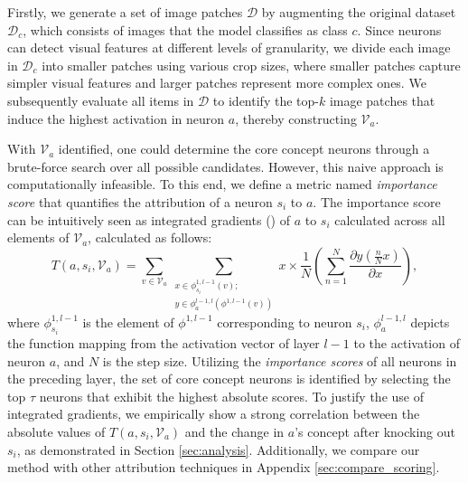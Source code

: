Firstly, we generate a set of image patches $\mathcal{D}$ by augmenting the original dataset $\mathcal{D}_c$, which consists of images that the model classifies as class $c$.
Since neurons can detect visual features at different levels of granularity, we divide each image in $\mathcal{D}_c$ into smaller patches using various crop sizes, where smaller patches capture simpler visual features and larger patches represent more complex ones. 
We subsequently evaluate all items in $\mathcal{D}$ to identify the top-$k$ image patches that induce the highest activation in neuron $a$, thereby constructing $\mathcal{V}_a$.

With $\mathcal{V}_a$ identified, one could determine the core concept neurons through a brute-force search over all possible candidates. However, this naive approach is computationally infeasible. 
To this end, we define a metric named \emph{importance score} that quantifies the attribution of a neuron $s_i$ to $a$.
The importance score can be intuitively seen as integrated gradients (\cite{IG}) of $a$ to $s_i$ calculated across all elements of $\mathcal{V}_a$, calculated as follows:
\begin{equation}
     T(a, s_i, \mathcal{V}_a) = \sum_{v\in \mathcal{V}_a} \sum_{ \substack{x \in \phi^{1, l-1}_{s_i}(v); \\ y \in \phi^{l-1,l}_a(\phi^{1,l-1}(v)) }} x \times \frac{1}{N} \left ( \sum_{n=1}^{N} \frac{\partial y(\frac{n}{N}x)}{\partial x} \right ),
\end{equation}
where $\phi^{1,l-1}_{s_i}$ is the element of $\phi^{1,l-1}$ corresponding to neuron $s_i$, $\phi^{l-1,l}_a$ depicts the function mapping from the activation vector of layer \( l-1 \) to the activation of neuron \( a \), and $N$ is the step size. 
Utilizing the \emph{importance scores} of all neurons in the preceding layer, the set of core concept neurons is identified by selecting the top $\tau$ neurons that exhibit the highest absolute scores.
To justify the use of integrated gradients, we empirically show a strong correlation between the absolute values of \( T(a, s_i, \mathcal{V}_a) \) and the change in \( a \)'s concept after knocking out \( s_i \), as demonstrated in Section \ref{sec:analysis}.
Additionally, we compare our method with other attribution techniques in Appendix \ref{sec:compare_scoring}.

